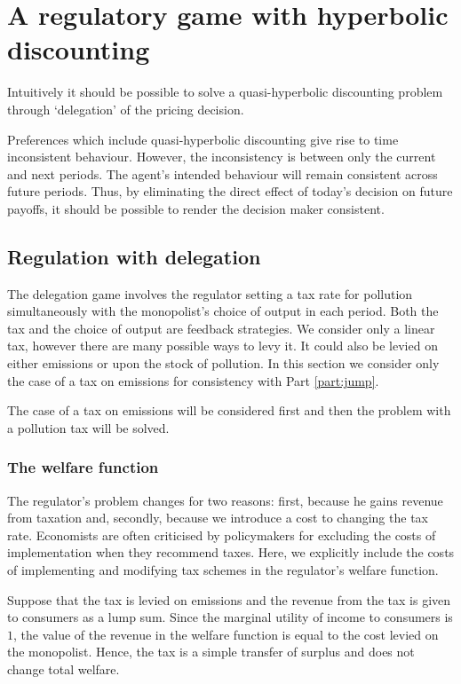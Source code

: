 
\chapter{A regulatory game with hyperbolic discounting}
\label{cha:proposition-1}


Intuitively it should be possible to solve a quasi-hyperbolic
discounting problem through `delegation' of the pricing
decision.

Preferences which include quasi-hyperbolic discounting give rise to
time inconsistent behaviour. However, the inconsistency is between
only the current and next periods. The agent's intended behaviour will
remain consistent across future periods. Thus, by eliminating the
direct effect of today's decision on future payoffs, it should be
possible to render the decision maker consistent.

\section{Regulation with delegation}
\label{sec:regul-with-deleg}

The delegation game involves the regulator setting a tax rate for
pollution simultaneously with the monopolist's choice of output in
each period. Both the tax and the choice of output are feedback
strategies. We consider only a linear tax, however there are many
possible ways to levy it. It could also be levied on either emissions
or upon the stock of pollution. In this section we consider only the
case of a tax on emissions for consistency with Part \ref{part:jump}.

The case of a tax on emissions will be considered first and then the
problem with a pollution tax will be solved.

\subsection{The welfare function}
\label{sec:welfare-function-1}

The regulator's problem changes for two reasons: first, because he
gains revenue from taxation and, secondly, because we introduce a cost
to changing the tax rate. Economists are often criticised by
policymakers for excluding the costs of implementation when they
recommend taxes. Here, we explicitly include the costs of implementing
and modifying tax schemes in the regulator's welfare function.

Suppose that the tax is levied on emissions and the revenue from the
tax is given to consumers as a lump sum. Since the marginal utility of
income to consumers is $1$, the value of the revenue in the welfare
function is equal to the cost levied on the monopolist. Hence, the tax
is a simple transfer of surplus and does not change total welfare.

